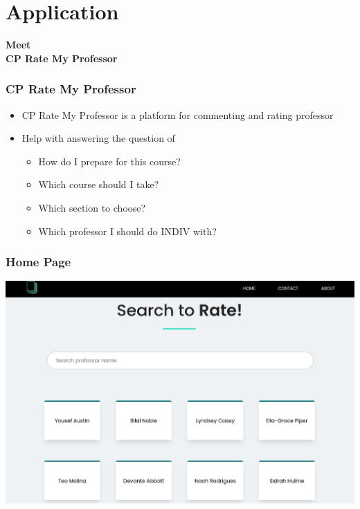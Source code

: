 \documentclass[aspectratio=169]{beamer}
\begin{document}
\section{Application}
\begin{frame}
    \centering
    \begin{spacing}{3}
        {\huge \textbf{Meet} }\pause\\
        {\huge \color{cyan}\textbf{CP Rate My Professor}}
    \end{spacing}
\end{frame}
\begin{frame}
    \frametitle{CP Rate My Professor}
    \begin{itemize}
        \item CP Rate My Professor is a platform for commenting and rating professor
        \item Help with answering the question of\pause
              \begin{spacing}{1.25}
                  \begin{itemize}
                      \item How do I prepare for this course?\pause
                      \item Which course should I take?\pause
                      \item Which section to choose?\pause
                      \item Which professor I should do INDIV with?
                  \end{itemize}
              \end{spacing}
    \end{itemize}
\end{frame}
\begin{frame}
    \frametitle{Home Page}
    \centering
    \includegraphics[scale=0.25]{ratemyprof_home.png}
\end{frame}
\end{document}
